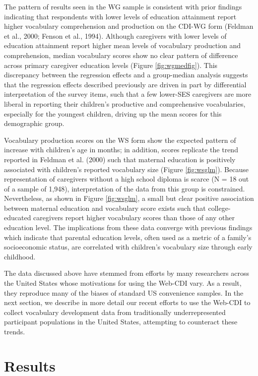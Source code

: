 \documentclass[
  english,
  man]{apa7}
\begin{document}
The pattern of results seen in the WG sample is consistent with prior findings indicating that respondents with lower levels of education attainment report higher vocabulary comprehension and production on the CDI-WG form (Feldman et al., 2000; Fenson et al., 1994). Although caregivers with lower levels of education attainment report higher mean levels of vocabulary production and comprehension, median vocabulary scores show no clear pattern of difference across primary caregiver education levels (Figure \ref{fig:wgmedfig}). This discrepancy between the regression effects and a group-median analysis suggests that the regression effects described previously are driven in part by differential interpretation of the survey items, such that a few lower-SES caregivers are more liberal in reporting their children's productive and comprehensive vocabularies, especially for the youngest children, driving up the mean scores for this demographic group.

Vocabulary production scores on the WS form show the expected pattern of increase with children's age in months; in addition, scores replicate the trend reported in Feldman et al. (2000) such that maternal education is positively associated with children's reported vocabulary size (Figure \ref{fig:wsglm}). Because representation of caregivers without a high school diploma is scarce (N = 18 out of a sample of 1,948), interpretation of the data from this group is constrained. Nevertheless, as shown in Figure \ref{fig:wsglm}, a small but clear positive association between maternal education and vocabulary score exists such that college-educated caregivers report higher vocabulary scores than those of any other education level. The implications from these data converge with previous findings which indicate that parental education levels, often used as a metric of a family's socioeconomic status, are correlated with children's vocabulary size through early childhood.

The data discussed above have stemmed from efforts by many researchers across the United States whose motivations for using the Web-CDI vary. As a result, they reproduce many of the biases of standard US convenience samples. In the next section, we describe in more detail our recent efforts to use the Web-CDI to collect vocabulary development data from traditionally underrepresented participant populations in the United States, attempting to counteract these trends.

\hypertarget{results}{%
\section{Results}\label{results}}
\end{document}
